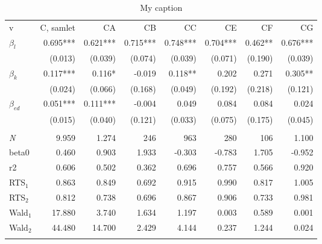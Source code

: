 \begin{table}[tb]
\centering
\caption{My caption}
\label{my-label}
\begin{tabular}{@{}lrrrrrrr@{}}\arrayrulecolor{MidnightBlue}\toprule
v             & C, samlet & CA       & CB       & CC       & CE       & CF      & CG       \\ \arrayrulecolor{MidnightBlue}\midrule
$\beta_l$      & 0.695***  & 0.621*** & 0.715*** & 0.748*** & 0.704*** & 0.462** & 0.676*** \\
              & (0.013)   & (0.039)  & (0.074)  & (0.039)  & (0.071)  & (0.190) & (0.039)  \\
$\beta_k$      & 0.117***  & 0.116*   & -0.019   & 0.118**  & 0.202    & 0.271   & 0.305**  \\
              & (0.024)   & (0.066)  & (0.168)  & (0.049)  & (0.192)  & (0.218) & (0.121)  \\
$\beta_{ed}$ & 0.051***  & 0.111*** & -0.004   & 0.049    & 0.084    & 0.084   & 0.024    \\
              & (0.015)   & (0.040)  & (0.121)  & (0.033)  & (0.075)  & (0.175) & (0.045)  \\
              &           &          &          &          &          &         &          \\
\emph{N}  & 9.959     & 1.274    & 246      & 963      & 280      & 106     & 1.100    \\
beta0         & 0.460     & 0.903    & 1.933    & -0.303   & -0.783   & 1.705   & -0.952   \\
r2            & 0.606     & 0.502    & 0.362    & 0.696    & 0.757    & 0.566   & 0.920    \\
RTS$_1$          & 0.863     & 0.849    & 0.692    & 0.915    & 0.990    & 0.817   & 1.005    \\
RTS$_2$           & 0.812     & 0.738    & 0.696    & 0.867    & 0.906    & 0.733   & 0.981    \\
Wald$_1$         & 17.880    & 3.740    & 1.634    & 1.197    & 0.003    & 0.589   & 0.001    \\
Wald$_2$         & 44.480    & 14.700   & 2.429    & 4.144    & 0.237    & 1.244   & 0.024   \\
\arrayrulecolor{MidnightBlue}\bottomrule
\end{tabular}
\end{table}